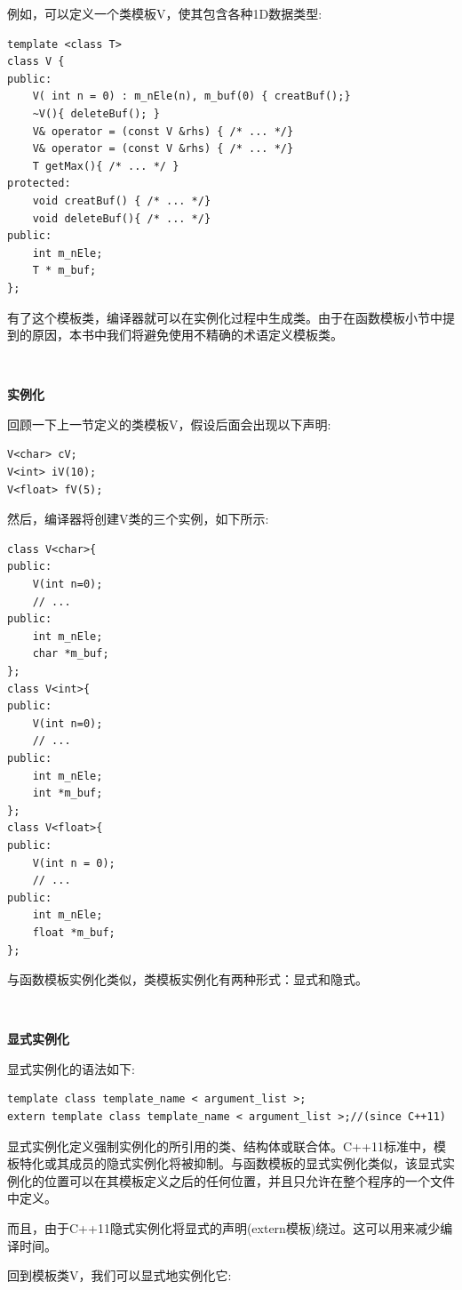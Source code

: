 例如，可以定义一个类模板V，使其包含各种1D数据类型:\par

\begin{lstlisting}[caption={}]
template <class T>
class V {
public:
	V( int n = 0) : m_nEle(n), m_buf(0) { creatBuf();}
	~V(){ deleteBuf(); }
	V& operator = (const V &rhs) { /* ... */}
	V& operator = (const V &rhs) { /* ... */}
	T getMax(){ /* ... */ }
protected:
	void creatBuf() { /* ... */}
	void deleteBuf(){ /* ... */}
public:
	int m_nEle;
	T * m_buf;
};
\end{lstlisting}

有了这个模板类，编译器就可以在实例化过程中生成类。由于在函数模板小节中提到的原因，本书中我们将避免使用不精确的术语定义模板类。 \par

\noindent\textbf{}\ \par
\textbf{实例化} \ \par
回顾一下上一节定义的类模板V，假设后面会出现以下声明: \par

\begin{lstlisting}[caption={}]
V<char> cV;
V<int> iV(10);
V<float> fV(5);
\end{lstlisting}

然后，编译器将创建V类的三个实例，如下所示: \par

\begin{lstlisting}[caption={}]
class V<char>{
public:
	V(int n=0);
	// ...
public:
	int m_nEle;
	char *m_buf;
};
class V<int>{
public:
	V(int n=0);
	// ...
public:
	int m_nEle;
	int *m_buf;
};
class V<float>{
public:
	V(int n = 0);
	// ...
public:
	int m_nEle;
	float *m_buf;
};
\end{lstlisting}

与函数模板实例化类似，类模板实例化有两种形式：显式和隐式。 \par

\noindent\textbf{}\ \par
\textbf{显式实例化} \ \par
显式实例化的语法如下: \par

\begin{lstlisting}[caption={}]
template class template_name < argument_list >;
extern template class template_name < argument_list >;//(since C++11)
\end{lstlisting}

显式实例化定义强制实例化的所引用的类、结构体或联合体。C++11标准中，模板特化或其成员的隐式实例化将被抑制。与函数模板的显式实例化类似，该显式实例化的位置可以在其模板定义之后的任何位置，并且只允许在整个程序的一个文件中定义。\par
而且，由于C++11隐式实例化将显式的声明(extern模板)绕过。这可以用来减少编译时间。 \par 
回到模板类V，我们可以显式地实例化它: \par

